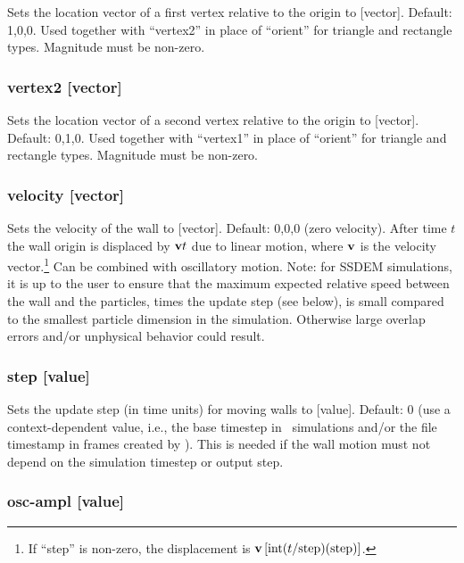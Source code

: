 Sets the location vector of a first vertex relative to the origin to
[vector].  Default: 1,0,0.  Used together with ``vertex2'' in place of
``orient'' for triangle and rectangle types.  Magnitude must be
non-zero.

\subsubsection{vertex2 [vector]}

Sets the location vector of a second vertex relative to the origin to
[vector].  Default: 0,1,0.  Used together with ``vertex1'' in place of
``orient'' for triangle and rectangle types.  Magnitude must be
non-zero.

\subsubsection{velocity [vector]}

Sets the velocity of the wall to [vector].  Default: 0,0,0 (zero
velocity).  After time $t$ the wall origin is displaced by $\mathbf{v}t$
due to linear motion, where $\mathbf{v}$ is the velocity
vector.\footnote{If ``step'' is non-zero, the displacement is
  $\mathbf{v} \left[ \mathrm{int} (t / \mathrm{step}) (\mathrm{step})
    \right]$.}  Can be combined with oscillatory motion.  Note: for
SSDEM simulations, it is up to the user to ensure that the maximum
expected relative speed between the wall and the particles, times the
update step (see below), is small compared to the smallest particle
dimension in the simulation.  Otherwise large overlap errors and/or
unphysical behavior could result.

\subsubsection{step [value]}

Sets the update step (in time units) for moving walls to [value].
Default: 0 (use a context-dependent value, i.e., the base timestep
 in \pkd\ simulations and/or the  file timestamp
in frames created by ).  This is needed if the wall
motion must not depend on the simulation timestep or output step.

\subsubsection{osc-ampl [value]}

